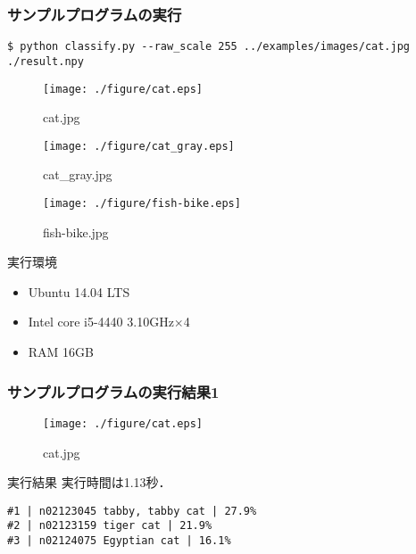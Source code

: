 \documentclass[dvipdfmx,11pt,notheorems]{beamer}
\theoremstyle{definition}
\begin{document}
\begin{frame}[fragile]\frametitle{サンプルプログラムの実行}
 \begin{lstlisting}[basicstyle=\ttfamily\footnotesize, frame=single]
$ python classify.py --raw_scale 255 ../examples/images/cat.jpg ./result.npy
\end{lstlisting}

\begin{figure}[t]
 \begin{minipage}{0.3\hsize}
  \centering
  \texttt{[image: ./figure/cat.eps]}
  \caption{cat.jpg}
  \label{sample1}
 \end{minipage}
 \begin{minipage}{0.3\hsize}
  \centering
  \texttt{[image: ./figure/cat\_gray.eps]}
  \caption{cat\_gray.jpg}
  \label{sample2}
 \end{minipage}
 \begin{minipage}{0.3\hsize}
  \centering
  \texttt{[image: ./figure/fish-bike.eps]}
  \caption{fish-bike.jpg}
  \label{sample3}
 \end{minipage}
\end{figure}
\begin{exampleblock}{実行環境} 
\begin{itemize}
 \item Ubuntu 14.04 LTS
 \item Intel core i5-4440 3.10GHz$\times$4
 \item RAM 16GB
\end{itemize}
\end{exampleblock}
\end{frame}

\begin{frame}[fragile]\frametitle{サンプルプログラムの実行結果1}
 \begin{figure}[t]
  \centering
  \texttt{[image: ./figure/cat.eps]}
  \caption{cat.jpg}
  \label{sample1}
 \end{figure}
\begin{exampleblock}{実行結果} 
実行時間は1.13秒．
\begin{lstlisting}[basicstyle=\ttfamily\footnotesize, frame=single,xleftmargin=5mm]
#1 | n02123045 tabby, tabby cat | 27.9%
#2 | n02123159 tiger cat | 21.9%
#3 | n02124075 Egyptian cat | 16.1%
\end{lstlisting}
\end{exampleblock}
\end{frame}
\end{document}
